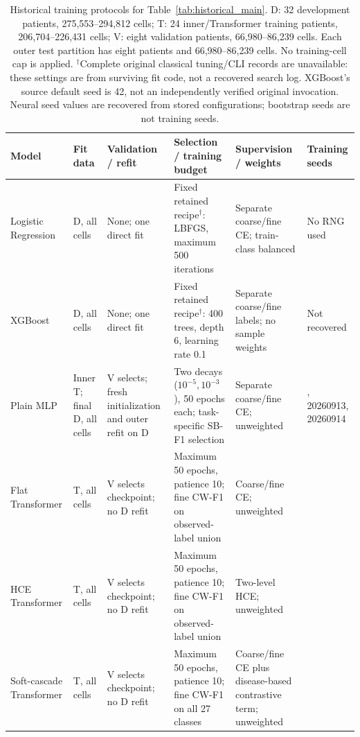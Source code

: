\begin{table}[H]
\centering\small
\setlength{\tabcolsep}{2.5pt}
\renewcommand{\arraystretch}{1.18}
\begin{tabular}{>{\raggedright\arraybackslash}p{.14\linewidth}>{\raggedright\arraybackslash}p{.12\linewidth}>{\raggedright\arraybackslash}p{.16\linewidth}>{\raggedright\arraybackslash}p{.24\linewidth}>{\raggedright\arraybackslash}p{.16\linewidth}>{\raggedright\arraybackslash}p{.10\linewidth}}
\toprule
Model & Fit data & Validation / refit & Selection / training budget & Supervision / weights & Training seeds \\
\midrule
Logistic Regression & D, all cells & None; one direct fit & Fixed retained recipe$^\dagger$: LBFGS, maximum 500 iterations & Separate coarse/fine CE; train-class balanced & No RNG used \\
XGBoost & D, all cells & None; one direct fit & Fixed retained recipe$^\dagger$: 400 trees, depth 6, learning rate 0.1 & Separate coarse/fine labels; no sample weights & Not recovered \\
Plain MLP & Inner T; final D, all cells & V selects; fresh initialization and outer refit on D & Two decays ($10^{-5},10^{-3}$), 50 epochs each; task-specific SB-F1 selection & Separate coarse/fine CE; unweighted & 20260912, 20260913, 20260914 \\
Flat Transformer & T, all cells & V selects checkpoint; no D refit & Maximum 50 epochs, patience 10; fine CW-F1 on observed-label union & Coarse/fine CE; unweighted & 42 \\
HCE Transformer & T, all cells & V selects checkpoint; no D refit & Maximum 50 epochs, patience 10; fine CW-F1 on observed-label union & Two-level HCE; unweighted & 42 \\
Soft-cascade Transformer & T, all cells & V selects checkpoint; no D refit & Maximum 50 epochs, patience 10; fine CW-F1 on all 27 classes & Coarse/fine CE plus disease-based contrastive term; unweighted & 42 \\
\bottomrule
\end{tabular}
\caption{Historical training protocols for Table~\ref{tab:historical_main}. D: 32 development
patients, 275,553--294,812 cells; T: 24 inner/Transformer training patients,
206,704--226,431 cells; V: eight validation patients, 66,980--86,239 cells.
Each outer test partition has eight patients and 66,980--86,239 cells.
No training-cell cap is applied. $^\dagger$Complete original classical
tuning/CLI records are unavailable: these settings are from surviving fit
code, not a recovered search log. XGBoost's source default seed is 42, not
an independently verified original invocation. Neural seed values are
recovered from stored configurations; bootstrap seeds are not training seeds.}
\label{tab:main_training_protocols}
\end{table}
